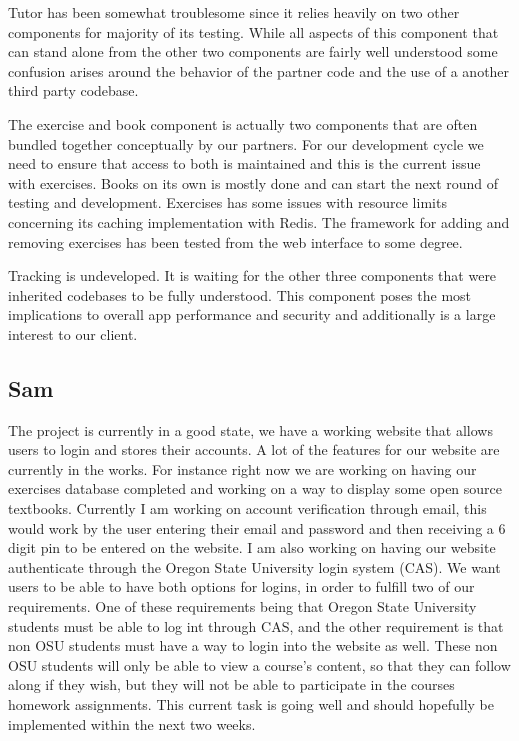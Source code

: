 \documentclass[onecolumn, draftclsnofoot,10pt, compsoc]{IEEEtran}
\begin{document}
Tutor has been somewhat troublesome since it relies heavily on two other components for majority of its testing. While all aspects of this component that can stand alone from the other two components are fairly well understood some confusion arises around the behavior of the partner code and the use of a another third party codebase.

The exercise and book component is actually two components that are often bundled together conceptually by our partners. For our development cycle we need to ensure that access to both is maintained and this is the current issue with exercises. Books on its own is mostly done and can start the next round of testing and development. Exercises has some issues with resource limits concerning its caching implementation with Redis. The framework for adding and removing exercises has been tested from the web interface to some degree. 

Tracking is undeveloped. It is waiting for the other three components that were inherited codebases to be fully understood. This component poses the most implications to overall app performance and security and additionally is a large interest to our client. 

\subsection{Sam}
The project is currently in a good state, we have a working website that allows users to login and stores their accounts. A lot of the features for our website are currently in the works. For instance right now we are working on having our exercises database completed and working on a way to display some open source textbooks. Currently I am working on account verification through email, this would work by the user entering their email and password and then receiving a 6 digit pin to be entered on the website. I am also working on having our website authenticate through the Oregon State University login system (CAS). We want users to be able to have both options for logins, in order to fulfill two of our requirements. One of these requirements being that Oregon State University students must be able to log int through CAS, and the other requirement is that non OSU students must have a way to login into the website as well. These non OSU students will only be able to view a course’s content, so that they can follow along if they wish, but they will not be able to participate in the courses homework assignments. This current task is going well and should hopefully be implemented within the next two weeks. 
\end{document}

